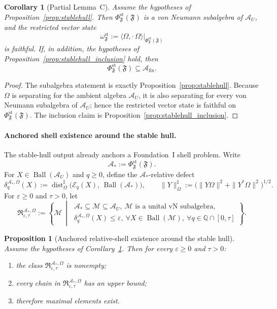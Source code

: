 \documentclass[12pt]{article}
\newtheorem{proposition}[theorem]{Proposition}
\newtheorem{corollary}[theorem]{Corollary}
\theoremstyle{definition}
\theoremstyle{remark}
\begin{document}
\begin{corollary}[Partial Lemma~C]\label{cor:partialC}
Assume the hypotheses of Proposition~\ref{prop:stablehull}. Then
\(\Phi_{\mathfrak F}^{\mathrm{st}}(\mathfrak F)\) is a von Neumann
subalgebra of \(\mathcal A_U\), and the restricted vector state
\[
\omega_{\mathfrak F}^{\mathrm{st}}
:=
\langle\Omega,\cdot\,\Omega\rangle|_{\Phi_{\mathfrak F}^{\mathrm{st}}(\mathfrak F)}
\]
is faithful. If, in addition, the hypotheses of
Proposition~\ref{prop:stablehull_inclusion} hold, then
\[
\Phi_{\mathfrak F}^{\mathrm{st}}(\mathfrak F)\subseteq
\mathcal A_{\mathrm{fix}}.
\]
\end{corollary}

\begin{proof}
The subalgebra statement is exactly
Proposition~\ref{prop:stablehull}. Because \(\Omega\) is separating for
the ambient algebra \(\mathcal A_U\), it is also separating for every
von Neumann subalgebra of \(\mathcal A_U\); hence the restricted vector
state is faithful on
\(\Phi_{\mathfrak F}^{\mathrm{st}}(\mathfrak F)\). The inclusion claim
is Proposition~\ref{prop:stablehull_inclusion}.
\end{proof}

\paragraph{Anchored shell existence around the stable hull.}
The stable-hull output already anchors a Foundation~I shell problem.
Write
\[
\mathcal A_*:=\Phi_{\mathfrak F}^{\mathrm{st}}(\mathfrak F).
\]
For \(X\in\operatorname{Ball}(\mathcal A_U)\) and \(q\ge 0\), define
the \(\mathcal A_*\)-relative defect
\[
\delta_q^{\mathcal A_*,\Omega}(X)
:=
\operatorname{dist}_{\Omega}^{\sharp}
\bigl(\mathcal E_q(X),\,\operatorname{Ball}(\mathcal A_*)\bigr),
\qquad
\|Y\|_\Omega^\sharp
:=
\bigl(\|Y\Omega\|^2+\|Y^*\Omega\|^2\bigr)^{1/2}.
\]
For \(\varepsilon\ge 0\) and \(\tau>0\), let
\[
\mathfrak R_{\varepsilon,\tau}^{\mathcal A_*,\Omega}
:=
\left\{
\mathcal M\ \middle|\
\begin{array}{l}
\mathcal A_*\subseteq \mathcal M\subseteq \mathcal A_U,\ \mathcal M
\text{ is a unital vN subalgebra},\\[1mm]
\delta_q^{\mathcal A_*,\Omega}(X)\le \varepsilon,\ \forall
X\in\operatorname{Ball}(\mathcal M),\
\forall q\in\mathbb Q\cap[0,\tau]
\end{array}
\right\}.
\]

\begin{proposition}[Anchored relative-shell existence around the stable hull]\label{prop:anchored_shell}
Assume the hypotheses of Corollary~\ref{cor:partialC}. Then for every
\(\varepsilon\ge 0\) and \(\tau>0\):
\begin{enumerate}
\item the class
  \(\mathfrak R_{\varepsilon,\tau}^{\mathcal A_*,\Omega}\) is
  nonempty;
\item every chain in
  \(\mathfrak R_{\varepsilon,\tau}^{\mathcal A_*,\Omega}\) has an
  upper bound;
\item therefore maximal elements exist.
\end{enumerate}
\end{proposition}
\end{document}
